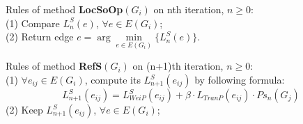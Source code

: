 \documentclass{acm_proc_article-sp}
\begin{document}
Rules of method \textbf{LocSoOp}$(G_{\textit{i}})$ on nth iteration, $n\geq0$:\\
(1) Compare $L_n^S(e)$, $\forall e\in E(G_{\textit{i}})$;\\
(2) Return edge $e=\arg\underset{e\in E(G_{\textit{i}})}{\min} \{L_n^S(e)\}$.

Rules of method \textbf{RefS}$(G_{\textit{i}})$ on (n+1)th iteration, $n\geq0$: \\
(1) $\forall e_{\textit{ij}}\in E(G_{\textit{i}})$, compute its  $L_{\textit{n+1}}^S(e_{\textit{ij}})$ by following formula:
$$L_{\textit{n+1}}^S(e_{\textit{ij}})=L_{\textit{WeiP}}^{S}(e_{\textit{ij}})+ \beta\cdot L_{\textit{TranP}}(e_{\textit{ij}})\cdot  Ps_{\textit{n}}(G_{\textit{j}})$$
(2) Keep $L_{\textit{n+1}}^S(e_{\textit{ij}})$, $\forall e\in E(G_{\textit{i}})$;
\end{document}
